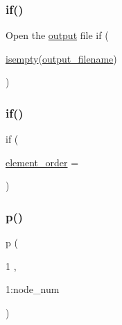 \mbox{\label{a00611_a96c738d3e2120c4273f9d4390761d99e}} 
\subsubsection{\texorpdfstring{if()}{if()}\hspace{0.1cm}{\footnotesize\ttfamily [1/2]}}
{\footnotesize\ttfamily Open the \hyperlink{a00623_a934120182a1459d17613528940e2bc61}{output} file if (\begin{DoxyParamCaption}\item[{\hyperlink{a00608_ad2a182e2e8932167c056732723f13e1c}{isempty}(\hyperlink{a00617_a5934d690c688edbd92210f38fe5855e7}{output\+\_\+filename})}]{ }\end{DoxyParamCaption})}

\mbox{\label{a00611_a378f77eb1cc67d215cfc19277889f140}} 
\subsubsection{\texorpdfstring{if()}{if()}\hspace{0.1cm}{\footnotesize\ttfamily [2/2]}}
{\footnotesize\ttfamily if (\begin{DoxyParamCaption}\item[{\hyperlink{a00611_aa77ee84ffb15118601acbd018f243edc}{element\+\_\+order}}]{ = {} }\end{DoxyParamCaption})}

\mbox{\label{a00611_a1e0420801cd5156c14e085b87a4945f5}} 
\subsubsection{\texorpdfstring{p()}{p()}}
{\footnotesize\ttfamily p (\begin{DoxyParamCaption}\item[{1}]{,  }\item[{1\+:node\+\_\+num}]{ }\end{DoxyParamCaption})}


